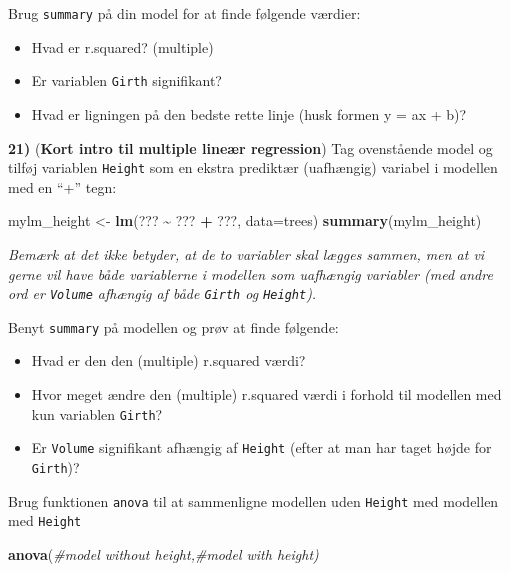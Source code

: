 \documentclass[
]{book}
\newenvironment{Shaded}{\begin{snugshade}}{\end{snugshade}}
\newcommand{\AttributeTok}[1]{\textcolor[rgb]{0.13,0.29,0.53}{#1}}
\newcommand{\CommentTok}[1]{\textcolor[rgb]{0.56,0.35,0.01}{\textit{#1}}}
\newcommand{\FunctionTok}[1]{\textcolor[rgb]{0.13,0.29,0.53}{\textbf{#1}}}
\newcommand{\NormalTok}[1]{#1}
\newcommand{\OtherTok}[1]{\textcolor[rgb]{0.56,0.35,0.01}{#1}}
\newcommand{\SpecialCharTok}[1]{\textcolor[rgb]{0.81,0.36,0.00}{\textbf{#1}}}
\providecommand{\tightlist}{%
  \setlength{\itemsep}{0pt}\setlength{\parskip}{0pt}}
\theoremstyle{definition}
\theoremstyle{definition}
\theoremstyle{definition}
\theoremstyle{definition}
\theoremstyle{remark}
\begin{document}
Brug \texttt{summary} på din model for at finde følgende værdier:

\begin{itemize}
\tightlist
\item
  Hvad er r.squared? (multiple)
\item
  Er variablen \texttt{Girth} signifikant?
\item
  Hvad er ligningen på den bedste rette linje (husk formen y = ax + b)?
\end{itemize}

\textbf{21)} (\textbf{Kort intro til multiple lineær regression}) Tag ovenstående model og tilføj variablen \texttt{Height} som en ekstra prediktær (uafhængig) variabel i modellen med en ``+'' tegn:

\begin{Shaded}
\begin{Highlighting}[]
\NormalTok{mylm\_height }\OtherTok{\textless{}{-}} \FunctionTok{lm}\NormalTok{(??? }\SpecialCharTok{\textasciitilde{}}\NormalTok{ ??? }\SpecialCharTok{+}\NormalTok{ ???, }\AttributeTok{data=}\NormalTok{trees) }
\FunctionTok{summary}\NormalTok{(mylm\_height)}
\end{Highlighting}
\end{Shaded}

\emph{Bemærk at det ikke betyder, at de to variabler skal lægges sammen, men at vi gerne vil have både variablerne i modellen som uafhængig variabler (med andre ord er \texttt{Volume} afhængig af både \texttt{Girth} og \texttt{Height}).}

Benyt \texttt{summary} på modellen og prøv at finde følgende:

\begin{itemize}
\tightlist
\item
  Hvad er den den (multiple) r.squared værdi?
\item
  Hvor meget ændre den (multiple) r.squared værdi i forhold til modellen med kun variablen \texttt{Girth}?
\item
  Er \texttt{Volume} signifikant afhængig af \texttt{Height} (efter at man har taget højde for \texttt{Girth})?
\end{itemize}

Brug funktionen \texttt{anova} til at sammenligne modellen uden \texttt{Height} med modellen med \texttt{Height}

\begin{Shaded}
\begin{Highlighting}[]
\FunctionTok{anova}\NormalTok{(}\CommentTok{\#model without height,\#model with height)}
\end{Highlighting}
\end{Shaded}
\end{document}
